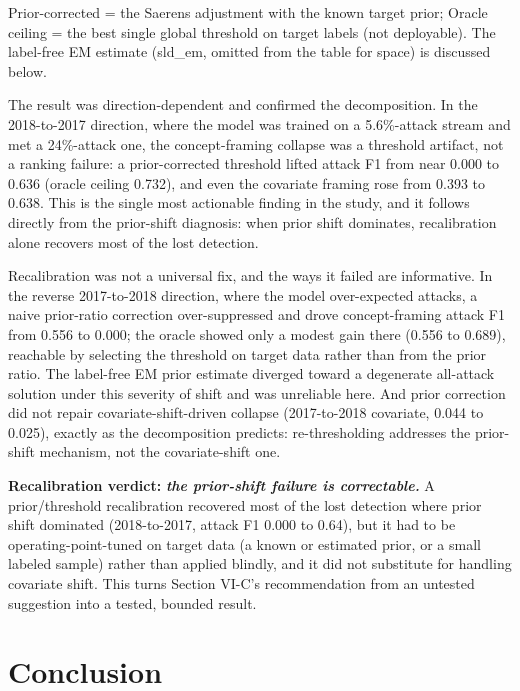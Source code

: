 \documentclass[conference]{IEEEtran}
\begin{document}
Prior-corrected = the Saerens adjustment with the known target prior; Oracle ceiling = the best single global threshold on target labels (not deployable). The label-free EM estimate (sld\_\allowbreak{}em, omitted from the table for space) is discussed below.
\par\medskip

The result was direction-dependent and confirmed the decomposition. In the 2018-to-2017 direction, where the model was trained on a 5.6\%-attack stream and met a 24\%-attack one, the concept-framing collapse was a threshold artifact, not a ranking failure: a prior-corrected threshold lifted attack F1 from near 0.000 to 0.636 (oracle ceiling 0.732), and even the covariate framing rose from 0.393 to 0.638. This is the single most actionable finding in the study, and it follows directly from the prior-shift diagnosis: when prior shift dominates, recalibration alone recovers most of the lost detection.
\par\medskip

Recalibration was not a universal fix, and the ways it failed are informative. In the reverse 2017-to-2018 direction, where the model over-expected attacks, a naive prior-ratio correction over-suppressed and drove concept-framing attack F1 from 0.556 to 0.000; the oracle showed only a modest gain there (0.556 to 0.689), reachable by selecting the threshold on target data rather than from the prior ratio. The label-free EM prior estimate diverged toward a degenerate all-attack solution under this severity of shift and was unreliable here. And prior correction did not repair covariate-shift-driven collapse (2017-to-2018 covariate, 0.044 to 0.025), exactly as the decomposition predicts: re-thresholding addresses the prior-shift mechanism, not the covariate-shift one.
\par\medskip

\textbf{Recalibration verdict: }\textbf{\textit{the prior-shift failure is correctable. }}A prior/threshold recalibration recovered most of the lost detection where prior shift dominated (2018-to-2017, attack F1 0.000 to 0.64), but it had to be operating-point-tuned on target data (a known or estimated prior, or a small labeled sample) rather than applied blindly, and it did not substitute for handling covariate shift. This turns Section VI-C's recommendation from an untested suggestion into a tested, bounded result.\par\medskip

\section{Conclusion}
\end{document}
